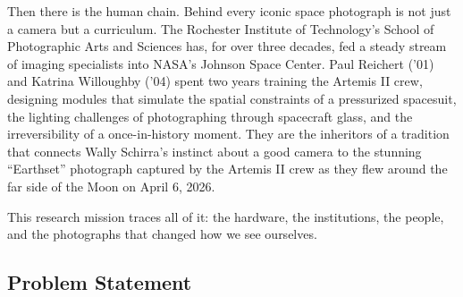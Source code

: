 \documentclass[11pt,letterpaper]{article}
\begin{document}
Then there is the human chain. Behind every iconic space photograph is not just a camera but a curriculum. The Rochester Institute of Technology's School of Photographic Arts and Sciences has, for over three decades, fed a steady stream of imaging specialists into NASA's Johnson Space Center. Paul Reichert ('01) and Katrina Willoughby ('04) spent two years training the Artemis II crew, designing modules that simulate the spatial constraints of a pressurized spacesuit, the lighting challenges of photographing through spacecraft glass, and the irreversibility of a once-in-history moment. They are the inheritors of a tradition that connects Wally Schirra's instinct about a good camera to the stunning ``Earthset'' photograph captured by the Artemis II crew as they flew around the far side of the Moon on April 6, 2026.

This research mission traces all of it: the hardware, the institutions, the people, and the photographs that changed how we see ourselves.

\subsection{Problem Statement}
\end{document}
